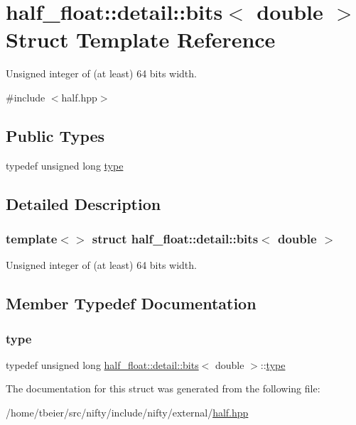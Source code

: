 \hypertarget{structhalf__float_1_1detail_1_1bits_3_01double_01_4}{}\section{half\+\_\+float\+:\+:detail\+:\+:bits$<$ double $>$ Struct Template Reference}
\label{structhalf__float_1_1detail_1_1bits_3_01double_01_4}


Unsigned integer of (at least) 64 bits width.  




{\ttfamily \#include $<$half.\+hpp$>$}

\subsection*{Public Types}
\begin{DoxyCompactItemize}
\item 
typedef unsigned long \hyperlink{structhalf__float_1_1detail_1_1bits_3_01double_01_4_aaa442f347d77cb5ed8a8331afd31636d}{type}
\end{DoxyCompactItemize}


\subsection{Detailed Description}
\subsubsection*{template$<$$>$\newline
struct half\+\_\+float\+::detail\+::bits$<$ double $>$}

Unsigned integer of (at least) 64 bits width. 

\subsection{Member Typedef Documentation}
\mbox{\label{structhalf__float_1_1detail_1_1bits_3_01double_01_4_aaa442f347d77cb5ed8a8331afd31636d}} 
\subsubsection{\texorpdfstring{type}{type}}
{\footnotesize\ttfamily typedef unsigned long \hyperlink{structhalf__float_1_1detail_1_1bits}{half\+\_\+float\+::detail\+::bits}$<$ double $>$\+::\hyperlink{structhalf__float_1_1detail_1_1bits_3_01double_01_4_aaa442f347d77cb5ed8a8331afd31636d}{type}}



The documentation for this struct was generated from the following file\+:\begin{DoxyCompactItemize}
\item 
/home/tbeier/src/nifty/include/nifty/external/\hyperlink{half_8hpp}{half.\+hpp}\end{DoxyCompactItemize}
